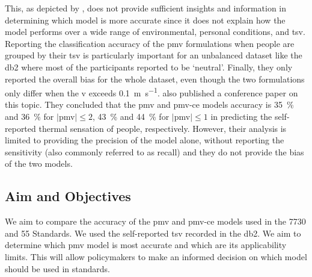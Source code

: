 This, as depicted by , does not provide sufficient insights and information in determining which model is more accurate since it does not explain how the model performs over a wide range of environmental, personal conditions, and \ac{tsv}.
Reporting the classification accuracy of the \ac{pmv} formulations when people are grouped by their \ac{tsv} is particularly important for an unbalanced dataset like the \ac{db2} where most of the participants reported to be `neutral'.
Finally, they only reported the overall bias for the whole dataset, even though the two formulations only differ when the \ac{v} exceeds \qty{0.1}{\m\per\s}.
 also published a conference paper on this topic.
They concluded that the \ac{pmv} and \ac{pmv-ce} models accuracy is \qty{35}{\percent} and \qty{36}{\percent} for $\mid$\ac{pmv}$\mid \leq 2$, \qty{43}{\percent} and \qty{44}{\percent} for $\mid$\ac{pmv}$\mid \leq 1$ in predicting the self-reported thermal sensation of people, respectively.
However, their analysis is limited to providing the precision of the model alone, without reporting the sensitivity (also commonly referred to as recall) and they do not provide the bias of the two models.

\subsection{Aim and Objectives}\label{subsec:aim-and-objectives}
We aim to compare the accuracy of the \ac{pmv} and \ac{pmv-ce} models used in the \gls{7730} and \gls{55} Standards.
We used the self-reported \ac{tsv} recorded in the \ac{db2}.
We aim to determine which \ac{pmv} model is most accurate and which are its applicability limits.
This will allow policymakers to make an informed decision on which model should be used in standards.